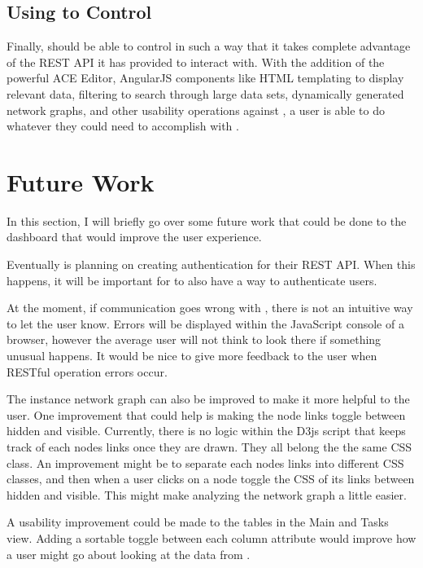 \subsection{Using \projectName{} to Control \ancor{}}

Finally, \projectName{} should be able to control \ancor{} in such a way that it takes complete advantage of the REST API it has provided to interact with. With the addition of the powerful ACE Editor, AngularJS components like HTML templating to display relevant data, filtering to search through large data sets, dynamically generated network graphs, and other usability operations against \ancor{}, a user is able to do whatever they could need to accomplish with \projectName{}.

\section{Future Work}
\label{makereference4.2}

In this section, I will briefly go over some future work that could be done to the dashboard that would improve the user experience.

Eventually \ancor{} is planning on creating authentication for their REST API. When this happens, it will be important for \projectName{} to also have a way to authenticate users.

At the moment, if communication goes wrong with \ancor{}, there is not an intuitive way to let the user know. Errors will be displayed within the JavaScript console of a browser, however the average user will not think to look there if something unusual happens. It would be nice to give more feedback to the user when RESTful operation errors occur.

The instance network graph can also be improved to make it more helpful to the user. One improvement that could help is making the node links toggle between hidden and visible. Currently, there is no logic within the D3js script that keeps track of each nodes links once they are drawn. They all belong the the same CSS class. An improvement might be to separate each nodes links into different CSS classes, and then when a user clicks on a node toggle the CSS of its links between hidden and visible. This might make analyzing the network graph a little easier.

A usability improvement could be made to the tables in the Main and Tasks view. Adding a sortable toggle between each column attribute would improve how a user might go about looking at the data from \ancor{}.
